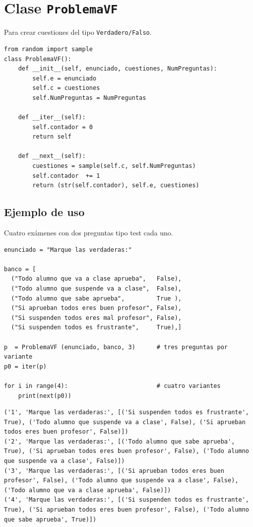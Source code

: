 \documentclass[10pt,a4paper]{report}
\begin{document}
\chapter{Clase \texttt{ProblemaVF}}
\label{sec:orgb8ec072}

Para crear cuestiones del tipo \texttt{Verdadero/Falso}.

\begin{verbatim}
from random import sample  
class ProblemaVF():
    def __init__(self, enunciado, cuestiones, NumPreguntas):
        self.e = enunciado
        self.c = cuestiones
        self.NumPreguntas = NumPreguntas

    def __iter__(self):
        self.contador = 0
        return self
    
    def __next__(self):
        cuestiones = sample(self.c, self.NumPreguntas)
        self.contador  += 1
        return (str(self.contador), self.e, cuestiones)

\end{verbatim}
\section{Ejemplo de uso}
\label{sec:orgfaf9c76}

Cuatro exámenes con dos preguntas tipo test cada uno.
\begin{verbatim}
enunciado = "Marque las verdaderas:"

banco = [
  ("Todo alumno que va a clase aprueba",   False),
  ("Todo alumno que suspende va a clase",  False),
  ("Todo alumno que sabe aprueba",         True ),
  ("Si aprueban todos eres buen profesor", False),
  ("Si suspenden todos eres mal profesor", False),
  ("Si suspenden todos es frustrante",     True),]

p  = ProblemaVF (enunciado, banco, 3)      # tres preguntas por variante
p0 = iter(p)

for i in range(4):                         # cuatro variantes
    print(next(p0))
\end{verbatim}

\label{Ejemplo de ProblemaVF}
\begin{verbatim}
('1', 'Marque las verdaderas:', [('Si suspenden todos es frustrante', True), ('Todo alumno que suspende va a clase', False), ('Si aprueban todos eres buen profesor', False)])
('2', 'Marque las verdaderas:', [('Todo alumno que sabe aprueba', True), ('Si aprueban todos eres buen profesor', False), ('Todo alumno que suspende va a clase', False)])
('3', 'Marque las verdaderas:', [('Si aprueban todos eres buen profesor', False), ('Todo alumno que suspende va a clase', False), ('Todo alumno que va a clase aprueba', False)])
('4', 'Marque las verdaderas:', [('Si suspenden todos es frustrante', True), ('Si aprueban todos eres buen profesor', False), ('Todo alumno que sabe aprueba', True)])
\end{verbatim}
\end{document}
